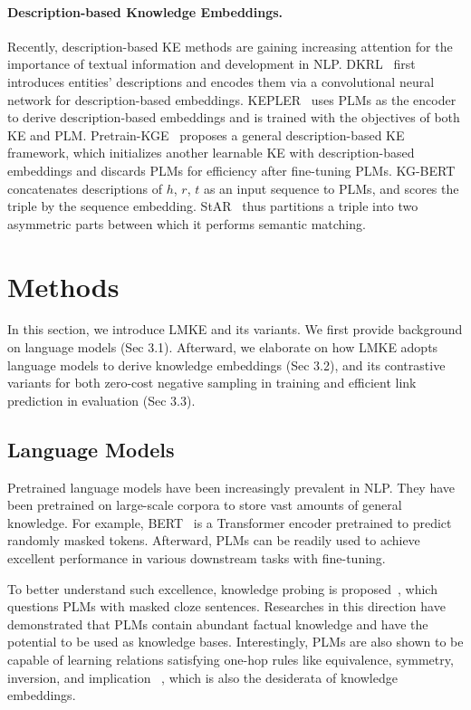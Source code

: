 \documentclass{article}
\begin{document}
\paragraph{\textbf{Description-based Knowledge Embeddings.}}  
Recently, description-based KE methods are gaining increasing attention for the importance of textual information and development in NLP.
DKRL~\cite{xie2016dkrl} first introduces entities' descriptions and encodes them via a convolutional neural network for description-based embeddings. 
KEPLER~\cite{wang2019kepler} uses PLMs as the encoder to derive description-based embeddings and is trained with the objectives of both KE and PLM.
Pretrain-KGE~\cite{zhang2020pretrainkge} proposes a general description-based KE framework, which initializes another learnable KE with description-based embeddings and discards PLMs for efficiency after fine-tuning PLMs.
KG-BERT~\cite{yao2019kgbert} concatenates descriptions of $h$, $r$, $t$ as an input sequence to PLMs, and scores the triple by the sequence embedding.
StAR~\cite{wang2021star} thus partitions a triple into two asymmetric parts
between which it performs semantic matching. 





\section{Methods}
In this section, we introduce LMKE and its variants.
We first provide background on language models (Sec 3.1). 
Afterward, we elaborate on how LMKE adopts language models to derive knowledge embeddings (Sec 3.2), 
and its contrastive variants for both zero-cost negative sampling  in training and efficient link prediction in evaluation (Sec 3.3).


\subsection{Language Models}
Pretrained language models have been increasingly prevalent in NLP. 
They have been pretrained on large-scale corpora to store vast amounts of general knowledge. 
For example, BERT~\cite{devlin2018bert} is a Transformer encoder pretrained to predict randomly masked tokens.
Afterward, PLMs can be readily used to achieve excellent performance in various downstream tasks with fine-tuning. 


To better understand such excellence, knowledge probing is proposed~\cite{petroni2019lama}, which questions PLMs with masked cloze sentences. Researches in this direction have demonstrated that PLMs contain abundant factual knowledge and have the potential to be used as knowledge bases. 
Interestingly, PLMs are also shown to be capable of learning relations satisfying one-hop rules like equivalence, symmetry, inversion, and implication ~\cite{kassner-etal-2020-symbolic}, which is also the desiderata of knowledge embeddings.
\end{document}
